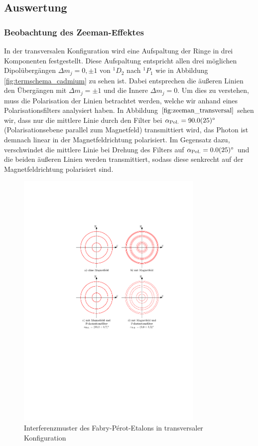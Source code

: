 \documentclass[11pt, a4paper]{article}
\begin{document}
\subsection{Auswertung}

\subsubsection{Beobachtung des Zeeman-Effektes}
In der transversalen Konfiguration wird eine Aufspaltung der Ringe in drei Komponenten festgestellt.
Diese Aufspaltung entspricht allen drei möglichen Dipolübergängen $\Delta m_j = 0, \pm 1$ von $^1D_2$ nach $^1P_1$ wie in Abbildung \ref{fig:termschema_cadmium} zu sehen ist.
Dabei entsprechen die äußeren Linien den Übergängen mit $\Delta m_j = \pm 1$ und die Innere $\Delta m_j = 0$.
Um dies zu verstehen, muss die Polarisation der Linien betrachtet werden, welche wir anhand eines Polarisationsfilters analysiert haben.
In Abbildung $\ref{fig:zeeman_transversal}$ sehen wir, dass nur die mittlere Linie durch den Filter bei $\alpha_\mathrm{Pol.} = \SI{90 +- 2,5}{\degree}$ (Polarisationsebene parallel zum Magnetfeld) transmittiert wird,  das Photon ist demnach linear in der Magnetfeldrichtung polarisiert.
Im Gegensatz dazu, verschwindet die mittlere Linie bei Drehung des Filters auf $\alpha_\mathrm{Pol.} = \SI{0 +- 2,5}{\degree}$ und die beiden äußeren Linien werden transmittiert, sodass diese senkrecht auf der Magnetfeldrichtung polarisiert sind.
\begin{figure}[h]
	\centering
	\includegraphics[width=0.8\textwidth]{./figures/zeeman_transversal.pdf}
	\caption{Interferenzmuster des Fabry-Pérot-Etalons in transversaler Konfiguration}
	\label{fig:zeeman_transversal}
\end{figure}
\end{document}
